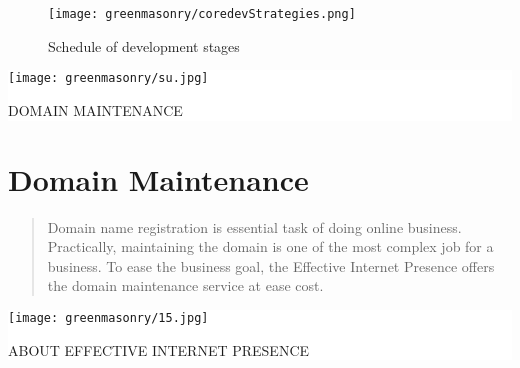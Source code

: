 \documentclass[35pt]{report}
\begin{document}
			\begin{figure}[htb]
				\begin{center}
				\texttt{[image: greenmasonry/coredevStrategies.png]}
				\caption{Schedule of development stages}
				\end{center}
			\end{figure}

		
\clearpage

\thispagestyle{empty}

\vspace*{2cm}
\colorbox{white}{
	\parbox[t]{1.0\linewidth}{
       	\begin{center} 
			\fontsize{40pt}{11pt}\selectfont 
			\vspace*{.5cm}
				\texttt{[image: greenmasonry/su.jpg]}
				{DOMAIN MAINTENANCE\par}
			\vspace*{.5cm}
		\end{center}
	}
}

\clearpage

\normalsize

\chapter{Domain Maintenance}

		\begin{quote}
		Domain name registration is essential task of doing online business. Practically, maintaining the domain is one of the most complex job for a business. To ease the business goal, the Effective Internet Presence offers the domain maintenance service at ease cost. 
		\end{quote}
		
\clearpage

\thispagestyle{empty}

\vspace*{2cm}
\colorbox{white}{
	\parbox[t]{1.0\linewidth}{
       	\begin{center} 
			\fontsize{40pt}{11pt}\selectfont 
			\vspace*{.5cm}
				{\texttt{[image: greenmasonry/15.jpg]}\par}
				{ABOUT EFFECTIVE INTERNET PRESENCE\par}
			\vspace*{.5cm}
		\end{center}
	}
}
\clearpage
\end{document}
